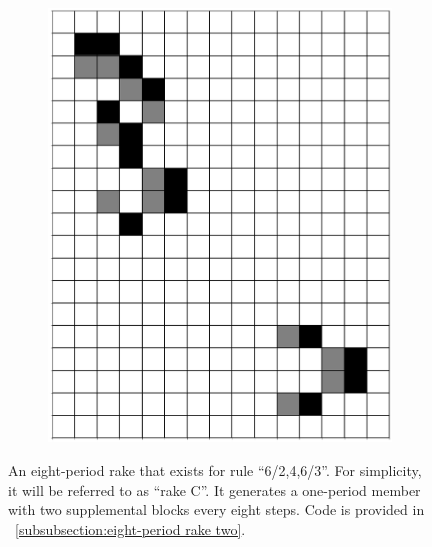\documentclass[12pt]{article}
\numberwithin{figure}{section} %
\begin{document}
\begin{figure}[H]
\begin{subfigure}{0.3\textwidth}
     		\includegraphics[width=\linewidth]{Section4/29.8}
     		\subcaption{}
   	\end{subfigure}
   	\setcounter{subfigure}{0}
   	\caption[Another eight-period rake]{An eight-period rake that exists for rule “6/2,4,6/3”. For simplicity, it will be referred to as “rake C”. It generates a one-period member with two supplemental blocks every eight steps. Code is provided in ~\ref{subsubsection:eight-period rake two}.}
   	\label{fig:eight-period rake two}
   	\vspace{-1.5em}
\end{figure}
\end{document}
